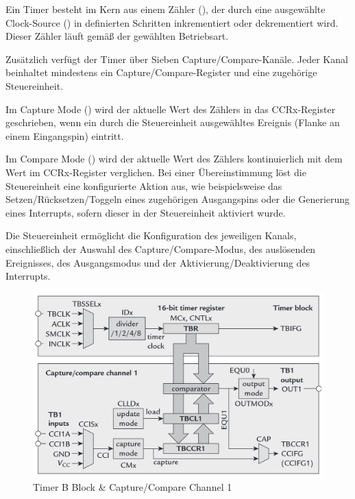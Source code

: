 Ein Timer besteht im Kern aus einem Z\"ahler (), der durch eine ausgew\"ahlte Clock-Source () in definierten Schritten inkrementiert oder dekrementiert wird. Dieser Z\"ahler l\"auft gem\"a{\ss} der gew\"ahlten Betriebsart.

Zus\"atzlich verf\"ugt der Timer \"uber Sieben Capture/Compare-Kan\"ale. Jeder Kanal beinhaltet mindestens ein Capture/Compare-Register und eine zugeh\"orige Steuereinheit.

Im Capture Mode () wird der aktuelle Wert des Z\"ahlers in das CCRx-Register geschrieben, wenn ein durch die Steuereinheit ausgew\"ahltes Ereignis (\zB Flanke an einem Eingangspin) eintritt.

Im Compare Mode () wird der aktuelle Wert des Z\"ahlers kontinuierlich mit dem Wert im CCRx-Register verglichen. Bei einer \"Ubereinstimmung l\"ost die Steuereinheit eine konfigurierte Aktion aus, wie beispielsweise das Setzen/R\"ucksetzen/Toggeln eines zugeh\"origen Ausgangspins oder die Generierung eines Interrupts, sofern dieser in der Steuereinheit aktiviert wurde.

Die Steuereinheit erm\"oglicht die Konfiguration des jeweiligen Kanals, einschließlich der Auswahl des Capture/Compare-Modus, des ausl\"osenden Ereignisses, des Ausgangsmodus und der Aktivierung/Deaktivierung des Interrupts.

\begin{figure}[h!]
	\centering
	\includegraphics[width=1.0\textwidth]{../Bilder/BlockDiagram_TimerB.png}
	\caption{Timer B Block \& Capture/Compare Channel 1\\}
	\label{fig:BlockDiagramm_Timer}
\end{figure}

